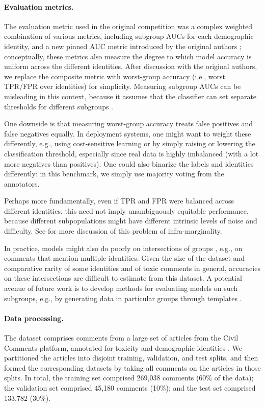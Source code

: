 \paragraph{Evaluation metrics.}
The evaluation metric used in the original competition was a complex weighted combination of various metrics, including subgroup AUCs for each demographic identity, and a new pinned AUC metric introduced by the original authors \citep{borkan2019nuanced}; conceptually, these metrics also measure the degree to which model accuracy is uniform across the different identities.
After discussion with the original authors, we replace the composite metric with worst-group accuracy (i.e., worst TPR/FPR over identities) for simplicity.
Measuring subgroup AUCs can be misleading in this context, because it assumes that the classifier can set separate thresholds for different subgroups \citep{borkan2019nuanced, borkan2019limitations}.

One downside is that measuring worst-group accuracy treats false positives and false negatives equally.
In deployment systems, one might want to weight these differently, e.g., using cost-sensitive learning or by simply raising or lowering the classification threshold,
especially since real data is highly imbalanced (with a lot more negatives than positives).
One could also binarize the labels and identities differently: in this benchmark, we simply use majority voting from the annotators.

Perhaps more fundamentally, even if TPR and FPR were balanced across different identities, this need not imply unambiguously equitable performance, because different subpopulations might have different intrinsic levels of noise and difficulty. See \citet{davies_measure_2018} for more discussion of this problem of infra-marginality.

In practice, models might also do poorly on intersections of groups \citep{kearns2018preventing}, e.g., on comments that mention multiple identities. Given the size of the dataset and comparative rarity of some identities and of toxic comments in general, accuracies on these intersections are difficult to estimate from this dataset.
A potential avenue of future work is to develop methods for evaluating models on such subgroups, e.g., by generating data in particular groups through templates
\citep{park2018reducing,ribeiro2020beyond}.

\paragraph{Data processing.}
The \CivilComments dataset comprises comments from a large set of articles from the Civil Comments platform, annotated for toxicity and demographic identities \citep{borkan2019nuanced}. We partitioned the articles into disjoint training, validation, and test splits, and then formed the corresponding datasets by taking all comments on the articles in those splits.
In total, the training set comprised 269,038 comments (60\% of the data); the validation set comprised 45,180 comments (10\%); and the test set comprised 133,782 (30\%).

